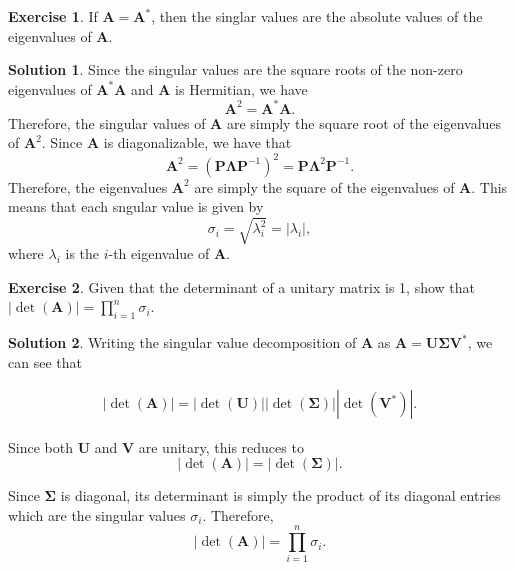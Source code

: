 \documentclass[12pt]{article}
\newcommand{\abs}[1]{ \left| #1 \right| }
\renewcommand{\vec}[1]{\mathbf{#1}}
\theoremstyle{definition}
\newtheorem{exer}{Exercise}
\newtheorem{sol}{Solution}
\theoremstyle{remark}
\begin{document}
\begin{exer}
    If $\vec{A}=\vec{A}^*$, then the singlar values are the absolute values of the eigenvalues of $\vec{A}$.
\end{exer}

\begin{sol}
    Since the singular values are the square roots of the non-zero eigenvalues of $\vec{A}^*\vec{A}$ and $\vec{A}$ is Hermitian, we have 
    \begin{equation}
        \vec{A}^2=\vec{A}^*\vec{A}.
    \end{equation}
Therefore, the singular values of $\vec{A}$ are simply the square root of the eigenvalues of $\vec{A}^2$. Since $\vec{A}$ is diagonalizable, we have that
\begin{equation}
    \vec{A}^2 = (\vec{P}\vec{\Lambda}\vec{P}^{-1})^2 = \vec{P}\vec{\Lambda}^2\vec{P}^{-1}.
\end{equation}
Therefore, the eigenvalues $\vec{A}^2$ are simply the square of the eigenvalues of $\vec{A}$. This means that each sngular value is given by
\begin{equation}
    \sigma_i = \sqrt{ \lambda_i^2 } = \abs{\lambda_i},
\end{equation}
where $\lambda_i$ is the $i$-th eigenvalue of $\vec{A}$.
\end{sol}

\begin{exer}
    Given that the determinant of a unitary matrix is 1, show that $\abs{\det (\vec{A})} = \prod_{i=1}^n \sigma_i$.
\end{exer}

\begin{sol}
    Writing the singular value decomposition of $\vec{A}$ as $\vec{A} = \vec{U}\vec{\Sigma}\vec{V}^*$, we can see that

    \begin{align}
    \abs{\det(\vec{A})} = \abs{\det(\vec{U})} \abs{\det(\vec{\Sigma})} \abs{\det(\vec{V}^*)}.   
    \end{align}

Since both $\vec{U}$ and $\vec{V}$ are unitary, this reduces to
\begin{equation}
    \abs{\det(\vec{A})} = \abs{\det(\vec{\Sigma})}. 
\end{equation}

Since $\vec{\Sigma}$ is diagonal, its determinant is simply the product of its diagonal entries which are the singular values $\sigma_i$. Therefore,
\begin{equation}
    \abs{\det(\vec{A})} = \prod_{i=1}^{n} \sigma_i. 
\end{equation}
\end{sol}
\end{document}
